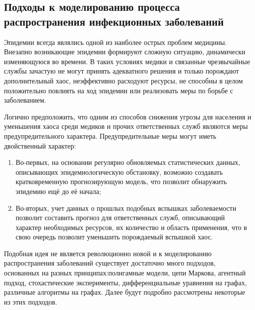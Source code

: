 \newpage
\parindent=1cm %
\begin{center}
		
		\section{Подходы к моделированию процесса распространения инфекционных заболеваний}
		
\end{center}

Эпидемии всегда являлись одной из наиболее острых проблем медицины. Внезапно возникающие эпидемии формируют сложную ситуацию, динамически изменяющуюся во времени. В таких условиях медики и связанные чрезвычайные службы зачастую не могут принять адекватного решения и только порождают дополнительный хаос, неэффективно расходуют ресурсы, не способны в целом положительно повлиять на ход эпидемии или реализовать меры по борьбе с заболеванием. 


Логично предположить, что одним из способов снижения угрозы для населения и уменьшения хаоса среди медиков и прочих ответственных служб являются меры предупредительного характера. Предупредительные меры могут иметь двойственный характер: 
\begin{enumerate}
	\item Во-первых, на основании регулярно обновляемых статистических данных, описывающих эпидемиологическую обстановку, возможно создавать кратковременную прогнозирующую модель, что позволит обнаружить эпидемию ещё до её начала;
	\item Во-вторых, учет данных о прошлых подобных вспышках заболеваемости позволит составить прогноз для ответственных служб, описывающий характер необходимых ресурсов, их количество и область применения, что в свою очередь позволит уменьшить порождаемый вспышкой хаос.
\end{enumerate}

Подобная идея не является революционно новой и  к моделированию распространения заболеваний существует  достаточно много подходов, основанных на разных принципах:полигамные модели,  цепи Маркова, агентный подход, стохастические эксперименты, дифференциальные уравнения на графах, различные алгоритмы на графах. Далее будут подробно рассмотрены некоторые из этих подходов.

